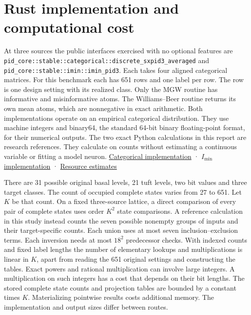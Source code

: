 \section{Rust implementation and computational cost}\label{rust-implementation-and-computational-cost}

At three sources the public interfaces exercised with no optional features are \nolinkurl{pid_core::stable::categorical::discrete_sxpid3_averaged} and \nolinkurl{pid_core::stable::imin::imin_pid3}. Each takes four aligned categorical matrices. For this benchmark each has 651 rows and one label per row. The row is one design setting with its realized class. Only the MGW routine has informative and misinformative atoms. The Williams--Beer routine returns its own mean atoms, which are nonnegative in exact arithmetic. Both implementations operate on an empirical categorical distribution. They use machine integers and binary64, the standard 64-bit binary floating-point format, for their numerical outputs. The two exact Python calculations in this report are research references. They calculate on counts without estimating a continuous variable or fitting a model neuron. \href{https://github.com/sepahead/pid-rs/blob/6a9f087be84bc21a89ff51e7da8e626e6883d73e/crates/pid-core/src/sxpid.rs}{Categorical implementation} · \href{https://github.com/sepahead/pid-rs/blob/6a9f087be84bc21a89ff51e7da8e626e6883d73e/crates/pid-core/src/discrete_pid.rs}{\(I_{\min}\) implementation} · \href{https://github.com/sepahead/pid-rs/blob/6a9f087be84bc21a89ff51e7da8e626e6883d73e/RUST_IMPLEMENTATION_AND_COST.md}{Resource estimates}

There are 31 possible original basal levels, 21 tuft levels, two bit values and three target classes. The count of occupied complete states varies from 27 to 651. Let \(K\) be that count. On a fixed three-source lattice, a direct comparison of every pair of complete states uses order \(K^2\) state comparisons. A reference calculation in this study instead counts the seven possible nonempty groups of inputs and their target-specific counts. Each union uses at most seven inclusion--exclusion terms. Each inversion needs at most \(18^2\) predecessor checks. With indexed counts and fixed label lengths the number of elementary lookups and multiplications is linear in \(K\), apart from reading the 651 original settings and constructing the tables. Exact powers and rational multiplication can involve large integers. A multiplication on such integers has a cost that depends on their bit lengths. The stored complete state counts and projection tables are bounded by a constant times \(K\). Materializing pointwise results costs additional memory. The implementation and output sizes differ between routes.

